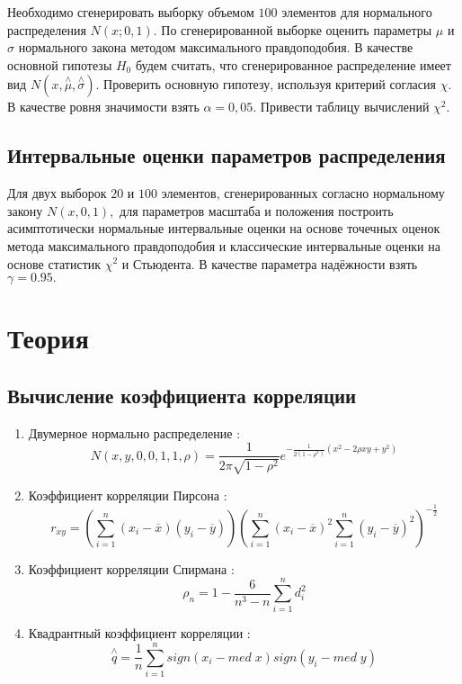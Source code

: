 \documentclass[a4]{article}
\begin{document}
Необходимо сгенерировать выборку объемом $100$ элементов для нормального распределения $N(x;0,1).$ По сгенерированной выборке оценить параметры $\mu$ и $\sigma$ нормального закона методом максимального правдоподобия. В качестве основной гипотезы $H_0$ будем считать, что сгенерированное распределение имеет вид $N(x,\overset{\wedge}{\mu},\overset{\wedge}{\sigma} ).$ Проверить основную гипотезу, используя критерий согласия $\chi$. В качестве ровня значимости взять $\alpha=0,05.$ Привести таблицу вычислений $\chi^2.$
\subsection{Интервальные оценки параметров распределения}

Для двух выборок $20$ и $100$ элементов, сгенерированных согласно нормальному закону $N(x,0,1),$ для параметров масштаба и положения построить асимптотически нормальные интервальные оценки на основе точечных оценок метода максимального правдоподобия и классические интервальные оценки на основе статистик $\chi^2$ и Стьюдента. В качестве параметра надёжности взять $\gamma = 0.95.$




\section{Теория}

\subsection{Вычисление коэффициента корреляции}

\begin{enumerate}
    \item Двумерное нормально распределение \cite{5_1}:
        \begin{equation}
        N(x,y,0,0,1,1,\rho) = \frac{1}{2\pi\sqrt{1-\rho^2}}e^{-\frac{1}{2(1-\rho^2)}(x^2-2\rho x y+y^2)} \label{dnd}
        \end{equation}
    
    \item Коэффициент корреляции Пирсона \cite{5_2}:
        \begin{equation}
        r_{xy} = \left(\sum\limits_{i=1}^n(x_i-\overline{x})(y_i-\overline{y})\right)\left(\sum\limits_{i=1}^n(x_i-\overline{x})^2\sum\limits_{i=1}^n(y_i-\overline{y})^2\right)^{-\frac{1}{2}} \label{ccp}
        \end{equation}
    \item Коэффициент корреляции Спирмана \cite{5_3}:
        \begin{equation}
        \rho_n = 1 -  \frac{6}{n^3-n}\sum\limits_{i=1}^n d_i^2\label{ccs}
        \end{equation}
        
    \item Квадрантный коэффициент корреляции \cite{5_4}:
        \begin{equation}
        \overset{\wedge}{q} = \frac{1}{n}\sum\limits_{i=1}^n sign(x_i-med\;x)sign(y_i-med\;y)\label{qcc}
        \end{equation}
\end{enumerate}
\end{document}
